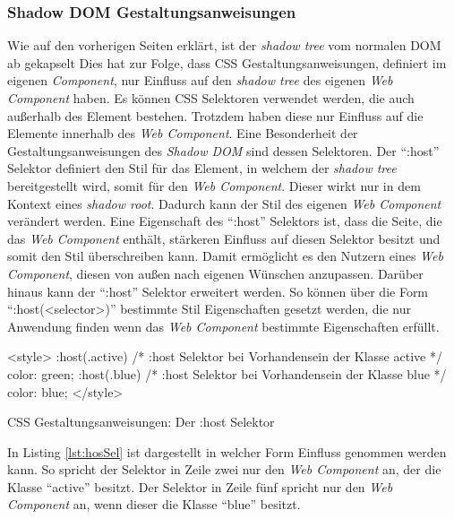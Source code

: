\documentclass[12pt, paper=a4, bibtotoc, toc=listof, headsepline=true, numbers=endperiod]{scrreprt}
\begin{document}
		\subsubsection{Shadow DOM Gestaltungsanweisungen}
		Wie auf den vorherigen Seiten erklärt, ist der \emph{shadow tree} vom normalen \ac{DOM} ab gekapselt Dies hat zur Folge, dass \ac{CSS} Gestaltungsanweisungen, definiert im eigenen \emph{Component}, nur Einfluss auf den \emph{shadow tree} des eigenen \emph{Web Component} haben. Es können \ac{CSS} Selektoren verwendet werden, die auch außerhalb des Element bestehen. Trotzdem haben diese nur Einfluss auf die Elemente innerhalb des \emph{Web Component}.  
		 \newline
		Eine Besonderheit der Gestaltungsanweisungen des \emph{Shadow DOM} sind dessen Selektoren. Der \enquote{:host} Selektor definiert den Stil für das Element, in welchem der \emph{shadow tree} bereitgestellt wird, somit für den \emph{Web Component}. Dieser wirkt nur in dem Kontext eines \emph{shadow root}. Dadurch kann der Stil des eigenen \emph{Web Component} verändert werden. Eine Eigenschaft des \enquote{:host} Selektors ist, dass die Seite, die das \emph{Web Component} enthält, stärkeren Einfluss auf diesen Selektor besitzt und somit den Stil überschreiben kann. Damit ermöglicht es den Nutzern eines \emph{Web Component}, diesen von außen nach eigenen Wünschen anzupassen. Darüber hinaus kann der \enquote{:host} Selektor erweitert werden. So können über die Form \enquote{:host(<selector>)} bestimmte Stil Eigenschaften gesetzt werden, die nur Anwendung finden wenn das \emph{Web Component} bestimmte Eigenschaften erfüllt. 
		\begin{listing}
		\begin{HTMLcode*}{}
<style>		
:host(.active) { /* :host Selektor bei Vorhandensein der Klasse active */
   color: green;
}
:host(.blue) { /* :host Selektor bei Vorhandensein der Klasse blue */
   color: blue;
}
</style>
		\end{HTMLcode*}
		\caption[Der :host Selektor]{CSS Gestaltungsanweisungen: Der :host Selektor}
		\label{lst:hosSel}
		\end{listing}\noindent
		In Listing \ref{lst:hosSel} ist dargestellt in welcher Form Einfluss genommen werden kann. So spricht der Selektor in Zeile zwei nur den \emph{Web Component} an, der die Klasse \enquote{active} besitzt. Der Selektor in Zeile fünf spricht nur den \emph{Web Component} an, wenn dieser die Klasse \enquote{blue} besitzt.
\end{document}
